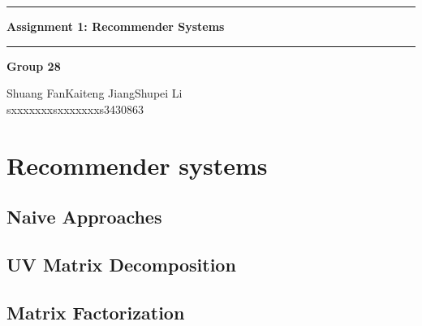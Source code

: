 \documentclass[12pt]{article}
\begin{document}
\noindent\rule{\textwidth}{1pt}
\begin{center}
    \LARGE \textbf{Assignment 1: Recommender Systems}
\end{center}
\noindent\rule{\textwidth}{0.5pt}
\begin{center}
    \textbf{Group 28}\par
    \vspace{0.3cm}
Shuang Fan\phantom{space}Kaiteng Jiang\phantom{space}Shupei Li\\
sxxxxxxx\phantom{spacespac}sxxxxxxx\phantom{spacespa}s3430863
\end{center}
\section{Recommender systems}
\subsection{Naive Approaches}

\subsection{UV Matrix Decomposition}

\subsection{Matrix Factorization}
\end{document}
